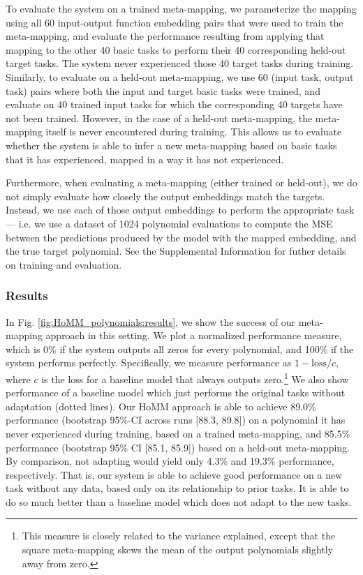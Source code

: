 To evaluate the system on a trained meta-mapping, we parameterize the mapping using all 60 input-output function embedding pairs that were used to train the meta-mapping, and evaluate the performance resulting from applying that mapping to the other 40 basic tasks to perform their 40 corresponding held-out target tasks. The system never experienced those 40 target tasks during training. Similarly, to evaluate on a held-out meta-mapping, we use 60 (input task, output task) pairs where both the input and target basic tasks were trained, and evaluate on 40 trained input tasks for which the corresponding 40 targets have not been trained. However, in the case of a held-out meta-mapping, the meta-mapping itself is never encountered during training. This allows us to evaluate whether the system is able to infer a new meta-mapping based on basic tasks that it has experienced, mapped in a way it has not experienced. 

Furthermore, when evaluating a meta-mapping (either trained or held-out), we do not simply evaluate how closely the output embeddings match the targets. Instead, we use each of those output embeddings to perform the appropriate task --- i.e. we use a dataset of 1024 polynomial evaluations to compute the MSE between the predictions produced by the model with the mapped embedding, and the true target polynomial. See the Supplemental Information for futher details on training and evaluation.

\subsubsection{Results}
In Fig. \ref{fig:HoMM_polynomials:results}, we show the success of our meta-mapping approach in this setting. We plot a normalized performance measure, which is 0\% if the system outputs all zeros for every polynomial, and 100\% if the system performs perfectly. Specifically, we measure performance as \(1 - \text{loss}/c\), where \(c\) is the loss for a baseline model that always outputs zero.\footnote{This measure is closely related to the variance explained, except that the square meta-mapping skews the mean of the output polynomials slightly away from zero.} We also show performance of a baseline model which just performs the original tasks without adaptation (dotted lines). Our HoMM approach is able to achieve 89.0\% performance (bootstrap 95\%-CI across runs [88.3, 89.8]) on a polynomial it has never experienced during training, based on a trained meta-mapping, and 85.5\% performance (bootstrap 95\% CI [85.1, 85.9]) based on a held-out meta-mapping. By comparison, not adapting would yield only 4.3\% and 19.3\% performance, respectively. That is, our system is able to achieve good performance on a new task without any data, based only on its relationship to prior tasks. It is able to do so much better than a baseline model which does not adapt to the new tasks. 

